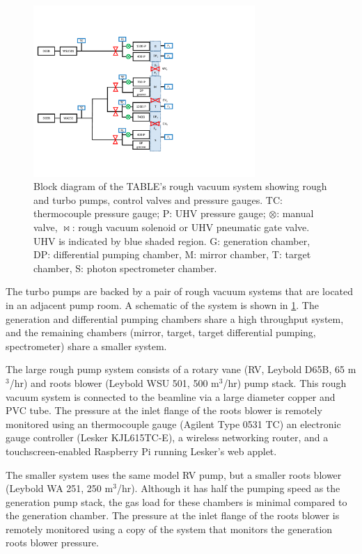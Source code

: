 \begin{figure}
	\centering
	\includegraphics[width=0.75\textwidth]{figures/chap2/rough_vacuum_schematic.pdf}
	\caption{Block diagram of the TABLE's rough vacuum system showing rough and turbo pumps, control valves and pressure gauges. TC: thermocouple pressure gauge; P: UHV pressure gauge; $\otimes$: manual valve, $\bowtie$: rough vacuum solenoid or UHV pneumatic gate valve. UHV is indicated by blue shaded region. G: generation chamber, DP: differential pumping chamber, M: mirror chamber, T: target chamber, S: photon spectrometer chamber.}
	\label{fig:rough_vacuum_schematic}
\end{figure}

The turbo pumps are backed by a pair of rough vacuum systems that are located in an adjacent pump room. A schematic of the system is shown in \cref{fig:rough_vacuum_schematic}. The generation and differential pumping chambers share a high throughput system, and the remaining chambers (mirror, target, target differential pumping, spectrometer) share a smaller system.

The large rough pump system consists of a rotary vane (RV, Leybold D65B, 65 m$^3$/hr) and roots blower (Leybold WSU 501, 500 m$^3$/hr) pump stack. This rough vacuum system is connected to the beamline via a large diameter copper and PVC tube. The pressure at the inlet flange of the roots blower is remotely monitored using an thermocouple gauge (Agilent Type 0531 TC) an electronic gauge controller (Lesker KJL615TC-E), a wireless networking router, and a touchscreen-enabled Raspberry Pi running Lesker's web applet.

The smaller system uses the same model RV pump, but a smaller roots blower (Leybold WA 251, 250 m$^3$/hr). Although it has half the pumping speed as the generation pump stack, the gas load for these chambers is minimal compared to the generation chamber. The pressure at the inlet flange of the roots blower is remotely monitored using a copy of the system that monitors the generation roots blower pressure.

